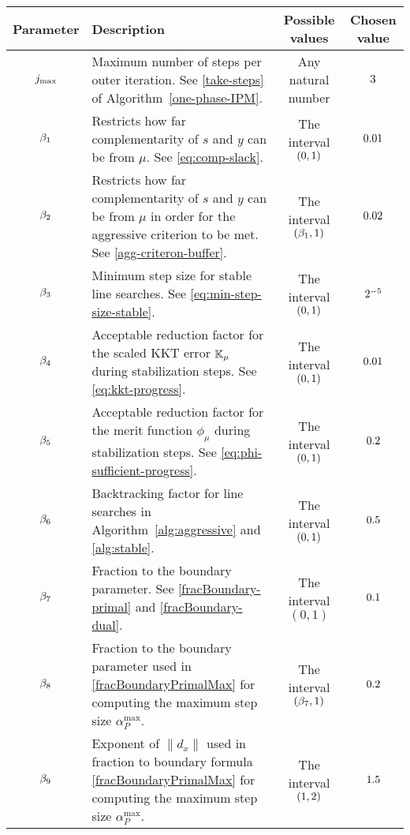 \documentclass{article}
\begin{document}
\begin{table}[H]
\begin{tabular}{ |c| p{7cm}|c|c| } 
 \hline
Parameter & Description & Possible values & Chosen value  \\ 
 \hline
$j_{\max}$ & Maximum number of steps per outer iteration. See \eqref{take-steps} of Algorithm~\ref{one-phase-IPM}.  & Any natural number & $3$  \\ 
 \hline
  $\beta_{1}$ & Restricts how far complementarity of $s$ and $y$ can be from $\mu$. See \eqref{eq:comp-slack}.  & The interval $(0,1)$ & $0.01$ \\ 
 \hline
   $\beta_{2}$ & Restricts how far complementarity of $s$ and $y$ can be from $\mu$ in order for the aggressive criterion to be met. See \eqref{agg-criteron-buffer}.  & The interval  $(\beta_{1},1)$ & $0.02$  \\ 
    \hline
   $\beta_{3}$ & Minimum step size for stable line searches. See \eqref{eq:min-step-size-stable}.  & The interval $(0,1)$ & $2^{-5}$  \\ 
   \hline 
      $\beta_{4}$ & Acceptable reduction factor for the scaled KKT error $\mathbb{K}_{\mu}$ during stabilization steps. See \eqref{eq:kkt-progress}.  & The interval $(0,1)$ & $0.01$ \\ 
      \hline
            $\beta_{5}$ & Acceptable reduction factor for the merit function $\phi_{\mu}$ during stabilization steps. See \eqref{eq:phi-sufficient-progress}.  & The interval $(0,1)$ & $0.2$  \\
    \hline
    $\beta_{6}$ & Backtracking factor for line searches in Algorithm~\ref{alg:aggressive} and \ref{alg:stable}. & The interval $(0,1)$ & $0.5$ \\
\hline
 $\beta_{7}$ & Fraction to the boundary parameter. See \eqref{fracBoundary-primal} and \eqref{fracBoundary-dual}. & The interval $(0,1)$ & $0.1$ \\ 
        \hline
$\beta_{8}$ & Fraction to the boundary parameter used in \eqref{fracBoundaryPrimalMax} for computing the maximum step size $\alpha_{P}^{\max}$. & The interval $(\beta_{7},1)$ & $0.2$ \\
\hline
$\beta_{9}$ & Exponent of $\| d_{x} \|$ used in fraction to boundary formula \eqref{fracBoundaryPrimalMax} for computing the maximum step size $\alpha_{P}^{\max}$. & The interval $(1,2)$ & $1.5$ \\

\end{tabular}
\end{table}
\end{document}
